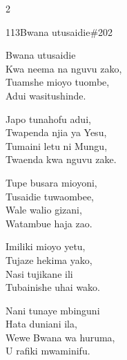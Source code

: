 \begin{multicols}{2}
\begin{hymn}{113}{Bwana utusaidie}{\#202}
\begin{stanza}
Bwana utusaidie\\
Kwa neema na nguvu zako,\\
Tuamshe mioyo tuombe,\\
Adui wasitushinde.
\end{stanza}
\begin{chorus}
Japo tunahofu adui,\\
Twapenda njia ya Yesu,\\
Tumaini letu ni Mungu,\\
Twaenda kwa nguvu zake.
\end{chorus}
\begin{stanza}
Tupe busara mioyoni,\\
Tusaidie tuwaombee,\\
Wale walio gizani,\\
Watambue haja zao.
\end{stanza}
\begin{stanza}
Imiliki mioyo yetu,\\
Tujaze hekima yako,\\
Nasi tujikane ili\\
Tubainishe uhai wako.
\end{stanza}
\begin{stanza}
Nani tunaye mbinguni\\
Hata duniani ila,\\
Wewe Bwana wa huruma,\\
U rafiki mwaminifu.
\end{stanza}
\end{hymn}


\end{multicols}
